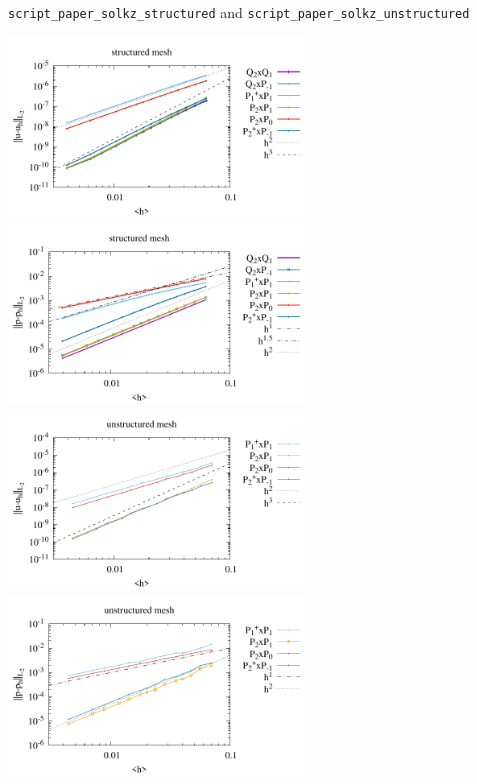 {\tt script\_paper\_solkz\_structured} and {\tt script\_paper\_solkz\_unstructured}

\begin{center}
\includegraphics[width=8cm]{python_codes/fieldstone_120/paperresults/solkz_structured_errorsV.pdf}
\includegraphics[width=8cm]{python_codes/fieldstone_120/paperresults/solkz_structured_errorsP.pdf}\\
\includegraphics[width=8cm]{python_codes/fieldstone_120/paperresults/solkz_unstructured_errorsV.pdf}
\includegraphics[width=8cm]{python_codes/fieldstone_120/paperresults/solkz_unstructured_errorsP.pdf}
\end{center}

